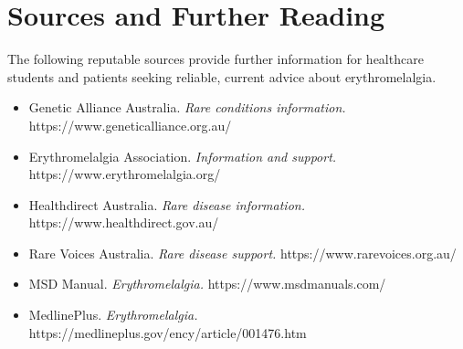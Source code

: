 \section*{Sources and Further Reading}
The following reputable sources provide further information for healthcare students and patients seeking reliable, current advice about erythromelalgia.
\begin{itemize}
    \item Genetic Alliance Australia. \textit{Rare conditions information.} https://www.geneticalliance.org.au/
    \item Erythromelalgia Association. \textit{Information and support.} https://www.erythromelalgia.org/
    \item Healthdirect Australia. \textit{Rare disease information.} https://www.healthdirect.gov.au/
    \item Rare Voices Australia. \textit{Rare disease support.} https://www.rarevoices.org.au/
    \item MSD Manual. \textit{Erythromelalgia.} https://www.msdmanuals.com/
    \item MedlinePlus. \textit{Erythromelalgia.} https://medlineplus.gov/ency/article/001476.htm
\end{itemize}
